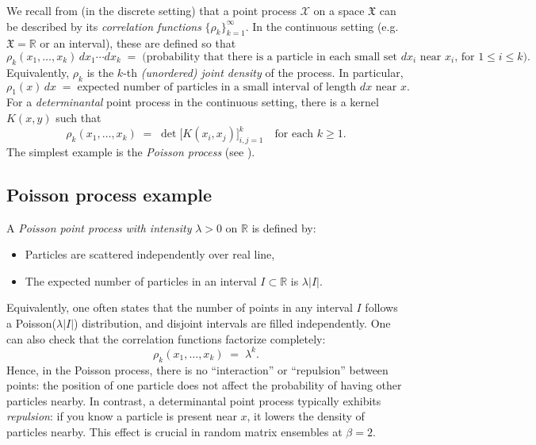 \documentclass[letterpaper,11pt,oneside,reqno]{book}
\numberwithin{equation}{chapter}  %
\theoremstyle{definition}
\begin{document}
We recall from  (in the discrete setting) that a point process \(\mathcal{X}\) on a space \(\mathfrak{X}\) can be described by its \emph{correlation functions} \(\{\rho_k\}_{k=1}^\infty\). In the continuous setting (e.g.\ \(\mathfrak{X}=\mathbb{R}\) or an interval), these are defined so that
\begin{equation}
  \rho_k(x_1,\dots,x_k)\,dx_1\cdots dx_k
  \;=\;
  \text{(probability that there is a particle in each small set $dx_i$ near $x_i$, for $1\le i\le k$)}.
\end{equation}
Equivalently, \(\rho_k\) is the \(k\)-th \emph{(unordered) joint density} of the process.  In particular,
\[
  \rho_1(x)\,dx
  \;=\;
  \text{expected number of particles in a small interval of length $dx$ near $x$.}
\]
For a \emph{determinantal} point process in the continuous setting, there is a kernel \(K(x,y)\) such that
\begin{equation}
  \label{lecture4:eq:rho-k-dpp-cont}
  \rho_k(x_1,\dots,x_k)
  \;=\;
  \det\bigl[K(x_i,x_j)\bigr]_{i,j=1}^k
  \quad
  \text{for each $k\ge1$}.
\end{equation}
The simplest example is the \emph{Poisson process} (see ).

\subsection{Poisson process example}
\label{lecture4:subsec:poisson-example}

A \emph{Poisson point process with intensity} \(\lambda>0\) on \(\mathbb{R}\) is defined by:
\begin{itemize}
	\item Particles are scattered independently over real line,
	\item The expected number of particles in an interval \(I\subset \mathbb{R}\) is \(\lambda|I|\).
\end{itemize}
Equivalently, one often states that the number of points in any interval \(I\) follows a Poisson(\(\lambda|I|\)) distribution, and disjoint intervals are filled independently.  One can also check that the correlation functions factorize completely:
\[
\rho_k(x_1,\dots,x_k) \;=\; \lambda^k.
\]
Hence, in the Poisson process, there is no ``interaction'' or ``repulsion'' between points: the position of one particle does not affect the probability of having other particles nearby.  In contrast, a determinantal point process typically exhibits \emph{repulsion}: if you know a particle is present near \(x\), it lowers the density of particles nearby.  This effect is crucial in random matrix ensembles at \(\beta=2\).
\end{document}

